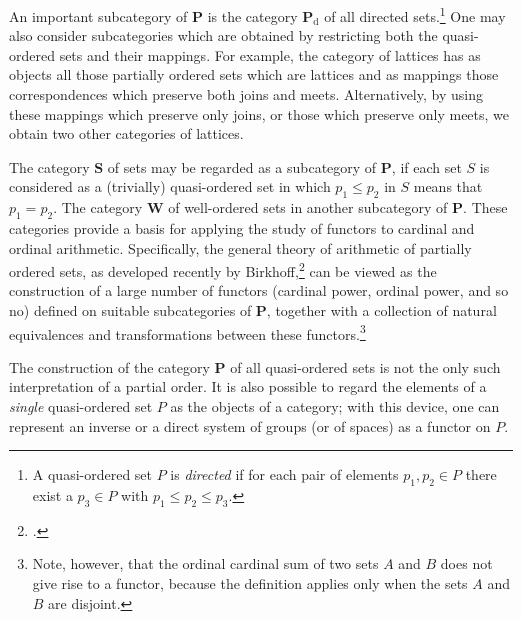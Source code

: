 \documentclass[11pt,a4paper]{report}
\begin{document}
An important subcategory of $\mathbf{P}$ is the category $\mathbf{P}_\text{d}$ of all directed sets.\footnote{A quasi\hyp{}ordered
set $P$ is \emph{directed} if for each pair of elements $p_1,p_2\in P$ there exist a $p_3\in P$ with $p_1 \le p_2 \le p_3$.} One may also
consider subcategories which are obtained by restricting both the quasi\hyp{}ordered sets and their mappings. For example, the
category of lattices has as objects all those partially ordered sets which are lattices and as mappings those correspondences which
preserve both joins and meets. Alternatively, by using these mappings which preserve only joins, or those which preserve only
meets, we obtain two other categories of lattices.

The category $\mathbf{S}$ of sets may be regarded as a subcategory of $\mathbf{P}$, if each set $S$ is considered as a (trivially)
quasi\hyp{}ordered set in which $p_1\le p_2$ in $S$ means that $p_1=p_2$. The category $\mathbf{W}$ of well\hyp{}ordered sets in
another subcategory of $\mathbf{P}$. These categories provide a basis for applying the study of functors to cardinal and ordinal
arithmetic. Specifically, the general theory of arithmetic of partially ordered sets, as developed recently by Birkhoff,\footcite{birk42}
can be viewed as the construction of a large number of functors (cardinal power, ordinal power, and so no) defined on suitable
subcategories of $\mathbf{P}$, together with a collection of natural equivalences and transformations between these functors.\footnote{Note,
however, that the ordinal cardinal sum of two sets $A$ and $B$ does not give rise to a functor, because the definition
applies only when the sets $A$ and $B$ are disjoint.}

The construction of the category $\mathbf{P}$ of all quasi\hyp{}ordered sets is not the only such interpretation of a partial
order. It is also possible to regard the elements of a \emph{single} quasi\hyp{}ordered set $P$ as the objects of a category;
with this device, one can represent an inverse or a direct system of groups (or of spaces) as a functor on $P$.
\end{document}
